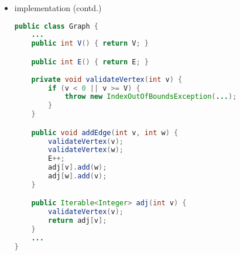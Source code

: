 \documentclass[8pt,a4paper,compress]{beamer}
\begin{document}
\begin{frame}[fragile]
\begin{itemize}
\item implementation (contd.)
\begin{lstlisting}[language=Java]
public class Graph {
    ...
    public int V() { return V; }

    public int E() { return E; }
 
    private void validateVertex(int v) {
        if (v < 0 || v >= V) {
            throw new IndexOutOfBoundsException(...);
        }
    }

    public void addEdge(int v, int w) {
        validateVertex(v);
        validateVertex(w);
        E++;
        adj[v].add(w);
        adj[w].add(v);
    }

    public Iterable<Integer> adj(int v) {
        validateVertex(v);
        return adj[v];
    }
    ...
}
\end{lstlisting}
\end{itemize}
\end{frame}
\end{document}
